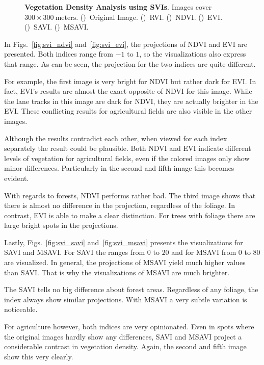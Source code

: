 \begin{figure}[h]
    \caption[Vegetation Density Analysis using SVIs]
    {\textbf{Vegetation Density Analysis using SVIs}. Images cover $300\times 300~\text{meters}$.
    ()~Original Image.
    ()~RVI.
    ()~NDVI.
    ()~EVI.
    ()~SAVI.
    ()~MSAVI.}
    \label{fig:vegetation_examples}
\end{figure}

In Figs.~\ref{fig:svi_ndvi} and~\ref{fig:svi_evi}, the projections of NDVI and EVI are presented. Both indices range from $-1$ to $1$, so the visualizations also express that range. As can be seen, the projection for the two indices are quite different.

For example, the first image is very bright for NDVI but rather dark for EVI. In fact, EVI's results are almost the exact opposite of NDVI for this image. While the lane tracks in this image are dark for NDVI, they are actually brighter in the EVI. These conflicting results for agricultural fields are also visible in the other images.

Although the results contradict each other, when viewed for each index separately the result could be plausible. Both NDVI and EVI indicate different levels of vegetation for agricultural fields, even if the colored images only show minor differences. Particularly in the second and fifth image this becomes evident.

With regards to forests, NDVI performs rather bad. The third image shows that there is almost no difference in the projection, regardless of the foliage. In contrast, EVI is able to make a clear distinction. For trees with foliage there are large bright spots in the projections.

Lastly, Figs.~\ref{fig:svi_savi} and~\ref{fig:svi_msavi} presents the visualizations for SAVI and MSAVI. For SAVI the ranges from $0$ to $20$ and for MSAVI from $0$ to $80$ are visualized. In general, the projections of MSAVI yield much higher values than SAVI. That is why the visualizations of MSAVI are much brighter.

The SAVI tells no big difference about forest areas. Regardless of any foliage, the index always show similar projections. With MSAVI a very subtle variation is noticeable.

For agriculture however, both indices are very opinionated. Even in spots where the original images hardly show any differences, SAVI and MSAVI project a considerable contrast in vegetation density. Again, the second and fifth image show this very clearly.

